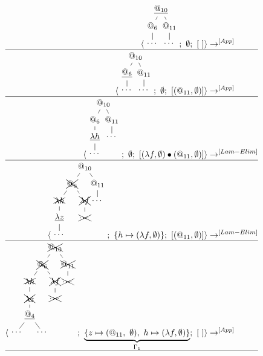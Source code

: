 \documentclass[a4paper, 10pt]{article}
\begin{document}
\begin{align*}
  \langle \begin{tikzpicture}[sibling distance=2em,level distance=2em]
    \node {\underline{$@_{10}$}}
    child { node {$@_6$}
      child { node {$\dots$}}}
    child { node {$@_{11}$}
      child { node {$\dots$}}};
  \end{tikzpicture};\ \emptyset;\ [\ ] \rangle & \rightarrow^{[App]}\\
  \hline
  \langle \begin{tikzpicture}[sibling distance=2em,level distance=2em]
    \node {$@_{10}$}
    child { node {\underline{$@_6$}}
      child { node {$\dots$}}}
    child { node {$@_{11}$}
      child { node {$\dots$}}};
  \end{tikzpicture};\ \emptyset;\ [ (@_{11}, \emptyset) ] \rangle & \rightarrow^{[App]}\\
  \hline
  \langle \begin{tikzpicture}[sibling distance=2em,level distance=2em]
    \node {$@_{10}$}
    child { node {$@_6$}
      child { node {\underline{$\lambda h$}}
        child { node {$\dots$}}}}
    child { node {$@_{11}$}
      child { node {$\dots$}}};
  \end{tikzpicture};\ \emptyset;\ [ (\lambda f, \emptyset) \bullet (@_{11}, \emptyset) ]
  \rangle & \rightarrow^{[Lam-Elim]}\\
  \hline
  \langle \begin{tikzpicture}[sibling distance=3em,level distance=2em]
    \node {$@_{10}$}
    child { node {\xcancel{$@_6$}}
      child { node {\xcancel{$\lambda h$}}
        child { node {\underline{$\lambda z$}}
          child { node {$\dots$}}}}
      child { node {\xcancel{$\lambda f$}}
        child { node {\xcancel{$\dots$}}}}}
    child { node {$@_{11}$}
      child { node {$\dots$}}};
  \end{tikzpicture};\ \{h \mapsto (\lambda f, \emptyset)\};\
  [ (@_{11}, \emptyset) ]  \rangle & \rightarrow^{[Lam-Elim]}\\
  \hline
  \langle \begin{tikzpicture}[sibling distance=3em,level distance=2em]
    \node {\xcancel{$@_{10}$}}
    child { node {\xcancel{$@_6$}}
      child { node {\xcancel{$\lambda h$}}
        child { node {\xcancel{$\lambda z$}}
          child { node {\underline{$@_4$}}
            child { node {$\dots$}}
            child { node {$\dots$}}}}}
      child { node {\xcancel{$\lambda f$}}
        child { node {\xcancel{$\dots$}}}}}
    child { node {\xcancel{$@_{11}$}}
      child { node {\xcancel{$\dots$}}}};
  \end{tikzpicture};\ \underbrace{\{z \mapsto (@_{11},\ \emptyset),\
    h \mapsto (\lambda f, \emptyset)\}}_{\Gamma_1};\ [\ ]  \rangle & \rightarrow^{[App]}\\
  \hline
  \end{align*}
\end{document}

